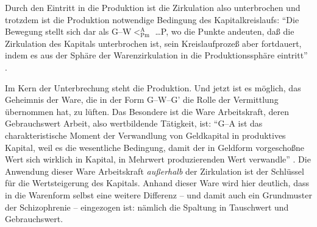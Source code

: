 \documentclass[12pt,
               paper=a4,
               twoside=false,
               onehalfspacing,
               bibliography=totoc,
               toc=graduated,
               ]{scrartcl}
\newcommand{\pc}[2]{\parencite[#1]{#2}}
\newcommand{\gwg}{G--W--G'\xspace}
\newcommand{\gwapmp}{G--W$<^{\text{A}}_{\text{Pm}}$ \dots P\xspace}
\begin{document}
Durch den Eintritt in die Produktion ist die Zirkulation also
unterbrochen und trotzdem ist die Produktion notwendige Bedingung des
Kapitalkreislaufs: "`Die Bewegung stellt sich dar als \gwapmp, wo die
Punkte andeuten, daß die Zirkulation des Kapitals unterbrochen ist,
sein Kreislaufprozeß aber fortdauert, indem es aus der Sphäre der
Warenzirkulation in die Produktionssphäre eintritt"' \pc{40}{kap2}.


Im Kern der Unterbrechung steht die Produktion. Und jetzt ist es
möglich, das Geheimnis der Ware, die in der Form \gwg die Rolle der
Vermittlung übernommen hat, zu lüften. Das Besondere ist die Ware
Arbeitskraft, deren Gebrauchswert Arbeit, also wertbildende Tätigkeit,
ist: "`G--A ist das charakteristische Moment der Verwandlung von
Geldkapital in produktives Kapital, weil es die wesentliche Bedingung,
damit der in Geldform vorgeschoßne Wert sich wirklich in Kapital, in
Mehrwert produzierenden Wert verwandle"' \pc{35}{kap2}. Die Anwendung
dieser Ware Arbeitskraft \emph{außerhalb} der Zirkulation ist der
Schlüssel für die Wertsteigerung des Kapitals. Anhand dieser Ware wird
hier deutlich, dass in die Warenform selbst eine weitere Differenz --
und damit auch ein Grundmuster der Schizophrenie -- eingezogen ist:
nämlich die Spaltung in Tauschwert und Gebrauchswert.

%
%
%
%
\end{document}
